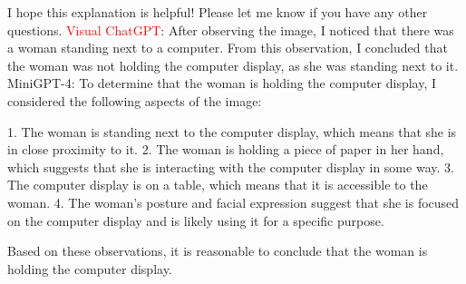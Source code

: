 \begin{enumerate}
        I hope this explanation is helpful! Please let me know if you have any other questions.
        \subitem \textcolor{red}{Visual ChatGPT}: After observing the image, I noticed that there was a woman standing next to a computer. From this observation, I concluded that the woman was not holding the computer display, as she was standing next to it.
        \subitem MiniGPT-4: To determine that the woman is holding the computer display, I considered the following aspects of the image:

        1. The woman is standing next to the computer display, which means that she is in close proximity to it.
        2. The woman is holding a piece of paper in her hand, which suggests that she is interacting with the computer display in some way.
        3. The computer display is on a table, which means that it is accessible to the woman.
        4. The woman’s posture and facial expression suggest that she is focused on the computer display and is likely using it for a specific purpose.
        
        Based on these observations, it is reasonable to conclude that the woman is holding the computer display.
    \end{enumerate}